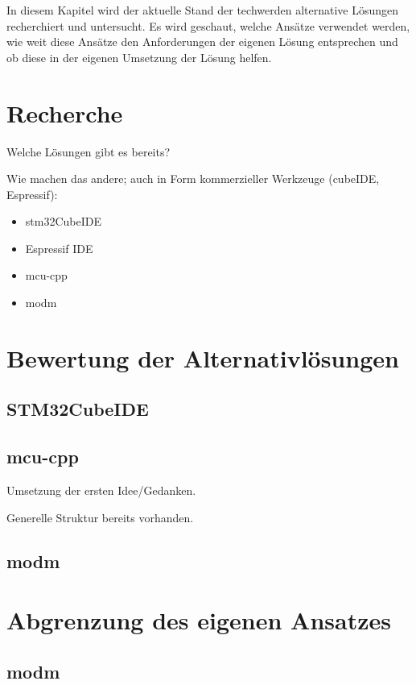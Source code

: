 In diesem Kapitel wird der aktuelle Stand der techwerden alternative Lösungen recherchiert und untersucht.
Es wird geschaut, welche Ansätze verwendet werden, wie weit diese Ansätze den Anforderungen der eigenen Lösung entsprechen und ob diese in der eigenen Umsetzung der Lösung helfen.

\section{Recherche}
Welche Lösungen gibt es bereits?


Wie machen das andere; auch in Form kommerzieller Werkzeuge (cubeIDE, Espressif):
\begin{itemize}
	\item stm32CubeIDE
	\item Espressif IDE
	\item mcu-cpp
	\item modm
\end{itemize}

\section{Bewertung der Alternativlösungen}
\subsection{STM32CubeIDE}




\subsection{mcu-cpp}
Umsetzung der ersten Idee/Gedanken.

Generelle Struktur bereits vorhanden.

\subsection{modm}


\section{Abgrenzung des eigenen Ansatzes}
\subsection{modm}


